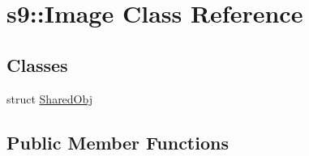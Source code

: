 \hypertarget{classs9_1_1Image}{\section{s9\-:\-:Image Class Reference}
\label{classs9_1_1Image}
}
\subsection*{Classes}
\begin{DoxyCompactItemize}
\item 
struct \hyperlink{structs9_1_1Image_1_1SharedObj}{Shared\-Obj}
\end{DoxyCompactItemize}
\subsection*{Public Member Functions}
